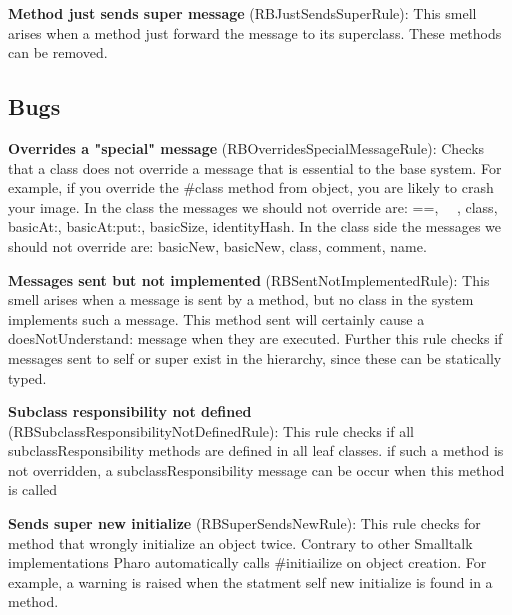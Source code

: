 \textbf{Method just sends super message} (RBJustSendsSuperRule): This smell arises when a method just forward the message to its superclass. These methods can be removed.

\subsection{Bugs}
\textbf{Overrides a "special" message} (RBOverridesSpecialMessageRule): Checks that a class does not override a message that is essential to the base system. For example, if you override the \#class method from object, you are likely to crash your image.
In the class the messages we should not override are: ==, ~~, class, basicAt:, basicAt:put:, basicSize, identityHash.
In the class side the messages we should not override are: basicNew, basicNew, class, comment, name.

\textbf{Messages sent but not implemented} (RBSentNotImplementedRule): This smell arises when a message is sent by a method,  but no class in the system implements such a message. This method sent will certainly cause a doesNotUnderstand: message when they are executed.  Further this rule checks if messages sent to self or super exist in the hierarchy, since these can be statically typed.

\textbf{Subclass responsibility not defined} (RBSubclassResponsibilityNotDefinedRule): This rule checks if all subclassResponsibility methods are defined in all leaf classes. if such a method is not overridden, a subclassResponsibility message can be occur when this method is called

\textbf{Sends super new initialize} (RBSuperSendsNewRule):  This rule checks for method that wrongly initialize an object twice. Contrary to other Smalltalk implementations Pharo automatically calls \#initiailize on object creation.
For example, a warning is raised when the statment self new initialize is found in a method.


